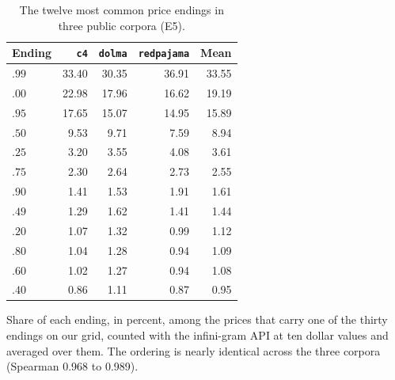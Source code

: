 \begin{table}[t]
\centering
\caption{The twelve most common price endings in three public corpora (E5).}
\label{tab:corpus}
\small
\begin{tabular}{lrrrr}
\toprule
Ending & \texttt{c4} & \texttt{dolma} & \texttt{redpajama} & Mean \\
\midrule
$.99$ & 33.40 & 30.35 & 36.91 & 33.55 \\
$.00$ & 22.98 & 17.96 & 16.62 & 19.19 \\
$.95$ & 17.65 & 15.07 & 14.95 & 15.89 \\
$.50$ & 9.53 & 9.71 & 7.59 & 8.94 \\
$.25$ & 3.20 & 3.55 & 4.08 & 3.61 \\
$.75$ & 2.30 & 2.64 & 2.73 & 2.55 \\
$.90$ & 1.41 & 1.53 & 1.91 & 1.61 \\
$.49$ & 1.29 & 1.62 & 1.41 & 1.44 \\
$.20$ & 1.07 & 1.32 & 0.99 & 1.12 \\
$.80$ & 1.04 & 1.28 & 0.94 & 1.09 \\
$.60$ & 1.02 & 1.27 & 0.94 & 1.08 \\
$.40$ & 0.86 & 1.11 & 0.87 & 0.95 \\
\bottomrule
\end{tabular}
\vspace{2pt}
\parbox{\linewidth}{\footnotesize Share of each ending, in percent, among the prices that carry one of the thirty endings on our grid, counted with the infini-gram API at ten dollar values and averaged over them. The ordering is nearly identical across the three corpora (Spearman 0.968 to 0.989).}
\end{table}
